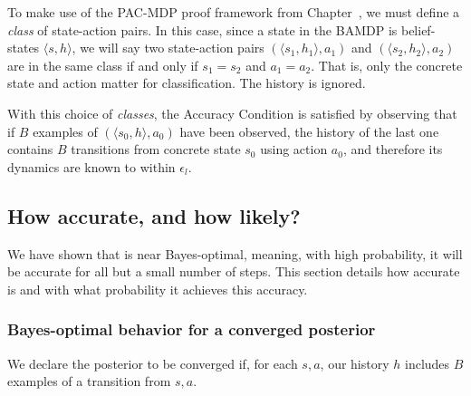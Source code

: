 To make use of the PAC-MDP proof framework from Chapter~, we must define a \emph{class} of state-action pairs. In this case, since a state in the BAMDP is belief-states $\langle s, h \rangle$, we will say two state-action pairs $(\langle s_1, h_1 \rangle, a_1)$ and $(\langle s_2, h_2 \rangle, a_2)$ are in the same class if and only if $s_1=s_2$ and $a_1=a_2$. That is, only the concrete state and action matter for classification. The history is ignored.

With this choice of \emph{classes}, the Accuracy Condition is satisfied by observing that if $B$ examples of $(\langle s_0, h \rangle,a_0)$ have been observed, the history of the last one contains $B$ transitions from concrete state $s_0$ using action $a_0$, and therefore its dynamics are known to within $\epsilon_l$.

\subsection{How accurate, and how likely?}

We have shown that  is near Bayes-optimal, meaning, with high probability, it will be accurate for all but a small number of steps. This section details how accurate  is and with what probability it achieves this accuracy.

\subsubsection{Bayes-optimal behavior for a converged posterior}
\label{sec-conv}
We declare the posterior to be converged if, for each $s,a$, our history $h$ includes $B$ examples of a transition from $s,a$.

